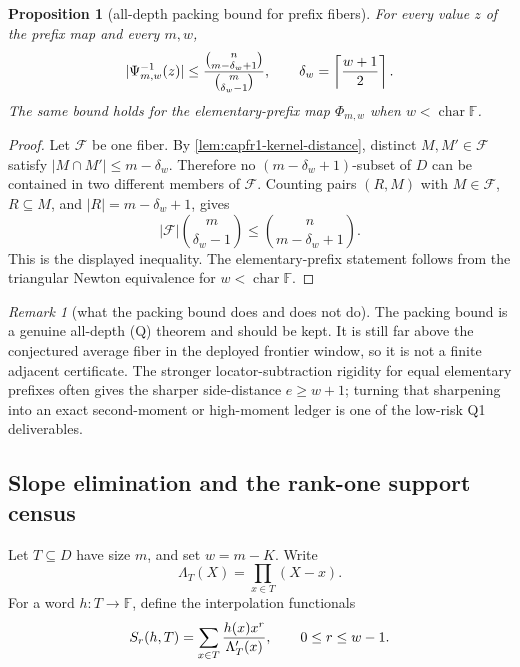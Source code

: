 \documentclass[11pt]{article}
\newtheorem{proposition}[proposition]{Proposition}
\theoremstyle{definition}
\theoremstyle{remark}
\newtheorem{remark}[remark]{Remark}
\newcommand{\F}{\mathbb{F}}
\begin{document}
\begin{proposition}[all-depth packing bound for prefix fibers]\label{prop:capfr1-prefix-packing}
For every value \(z\) of the prefix map and every \(m,w\),
\[
        |\Psi_{m,w}^{-1}(z)|
        \le
        {\binom{n}{m-\delta_w+1}\over \binom{m}{\delta_w-1}},
        \qquad
        \delta_w=\left\lceil {w+1\over2}\right\rceil .
\]
The same bound holds for the elementary-prefix map \(\Phi_{m,w}\) when \(w<\operatorname{char}\F\).
\end{proposition}

\begin{proof}
Let \(\mathcal F\) be one fiber.  By \cref{lem:capfr1-kernel-distance}, distinct \(M,M'\in\mathcal F\) satisfy \(|M\cap M'|\le m-\delta_w\).  Therefore no \((m-\delta_w+1)\)-subset of \(D\) can be contained in two different members of \(\mathcal F\).  Counting pairs \((R,M)\) with \(M\in\mathcal F\), \(R\subseteq M\), and \(|R|=m-\delta_w+1\), gives
\[
        |\mathcal F|\binom{m}{\delta_w-1}
        \le
        \binom n {m-\delta_w+1}.
\]
This is the displayed inequality.  The elementary-prefix statement follows from the triangular Newton equivalence for \(w<\operatorname{char}\F\).
\end{proof}

\begin{remark}[what the packing bound does and does not do]\label{rem:capfr1-packing-gap}
The packing bound is a genuine all-depth \textup{(Q)} theorem and should be kept.  It is still far above the conjectured average fiber in the deployed frontier window, so it is not a finite adjacent certificate.  The stronger locator-subtraction rigidity for equal elementary prefixes often gives the sharper side-distance \(e\ge w+1\); turning that sharpening into an exact second-moment or high-moment ledger is one of the low-risk Q1 deliverables.
\end{remark}

\subsection{Slope elimination and the rank-one support census}\label{subsec:capfr1-slope-elimination}

Let \(T\subseteq D\) have size \(m\), and set \(w=m-K\).  Write
\[
        \Lambda_T(X)=\prod_{x\in T}(X-x).
\]
For a word \(h:T\to\F\), define the interpolation functionals
\[
        S_r(h,T)=\sum_{x\in T}{h(x)x^r\over \Lambda_T'(x)},
        \qquad 0\le r\le w-1.
\]
\end{document}
